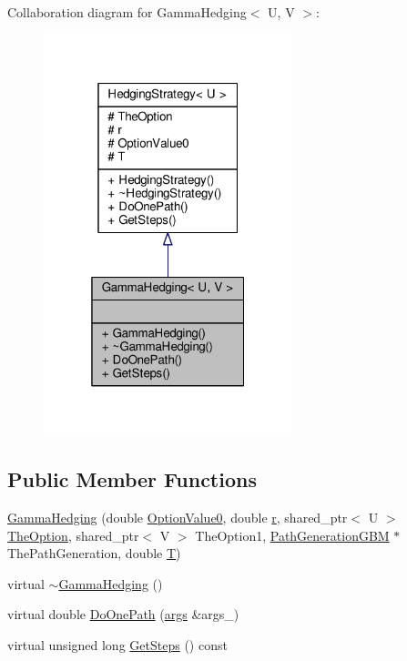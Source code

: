 Collaboration diagram for Gamma\+Hedging$<$ U, V $>$\+:
\nopagebreak
\begin{figure}[H]
\begin{center}
\leavevmode
\includegraphics[width=205pt]{classGammaHedging__coll__graph}
\end{center}
\end{figure}
\subsection*{Public Member Functions}
\begin{DoxyCompactItemize}
\item 
\hyperlink{classGammaHedging_aa93e888fe06bc5ec877364dfaed43f5e}{Gamma\+Hedging} (double \hyperlink{classHedgingStrategy_ac96528e9f4e5a0d1e5aadcc2ebdcab55}{Option\+Value0}, double \hyperlink{classHedgingStrategy_a313da7bc1911dba2a166d2c7bed5f1d7}{r}, shared\+\_\+ptr$<$ U $>$ \hyperlink{classHedgingStrategy_a65699a183423af9d947bb939ae8e907d}{The\+Option}, shared\+\_\+ptr$<$ V $>$ The\+Option1, \hyperlink{classPathGenerationGBM}{Path\+Generation\+G\+BM} $\ast$The\+Path\+Generation, double \hyperlink{classHedgingStrategy_aedb4069f0709b49482a72b9d9c906a5e}{T})
\item 
virtual \hyperlink{classGammaHedging_ad2d180e1aec52c7e58af34dbf8c7c66e}{$\sim$\+Gamma\+Hedging} ()
\item 
virtual double \hyperlink{classGammaHedging_afbdeab9edb6f515f8df2c1aac8ad54c0}{Do\+One\+Path} (\hyperlink{path__generation_8h_a75c13cde2074f502cc4348c70528572d}{args} \&args\+\_\+)
\item 
virtual unsigned long \hyperlink{classGammaHedging_a69b52f6cdb02d3289bf00029331625fe}{Get\+Steps} () const
\end{DoxyCompactItemize}
